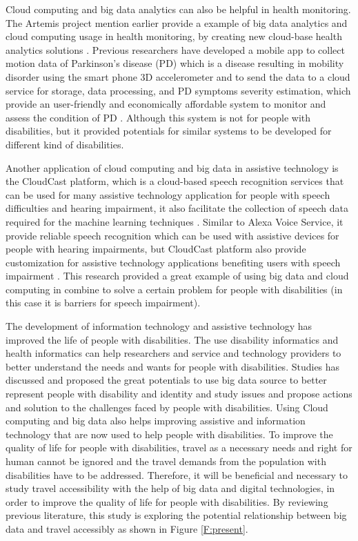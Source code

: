 Cloud computing and big data analytics can also be helpful in health monitoring. The Artemis project mention earlier
provide a example of big data analytics and cloud computing usage in health monitoring, by creating new cloud-base
health analytics solutions \cite{Khazaei14}. Previous researchers have developed a mobile app to collect motion 
data of Parkinson's disease (PD) which is a disease resulting in mobility disorder using the smart phone 3D 
accelerometer and to send the data to a cloud service for storage, data processing, and PD symptoms severity
estimation, which provide an user-friendly and economically affordable system to monitor and assess the condition
of PD \cite{info:doi/10.2196/mhealth.3956}. Although this system is not for people with disabilities, but it 
provided potentials for similar systems to be developed for different kind of disabilities. 

Another application of cloud computing and big data in assistive technology is the CloudCast platform, which is a 
cloud-based speech recognition services that can be used for many assistive technology application for people
with speech difficulties and hearing impairment, it also facilitate the collection of speech data required for
the machine learning techniques \cite{cunningham2017cloud}. Similar to Alexa Voice Service, it provide reliable 
speech recognition which can be used with assistive devices for people with hearing impairments, but CloudCast
platform also provide customization for assistive technology applications benefiting users with speech 
impairment \cite{cunningham2017cloud}. This research provided a great example of using big data and cloud 
computing in combine to solve a certain problem for people with disabilities (in this case it is barriers for speech impairment). 

The development of information technology and assistive technology has improved the life of people with disabilities.
The use disability informatics and health informatics can help researchers and service and technology providers 
to better understand the needs and wants for people with disabilities. Studies has discussed and proposed the 
great potentials to use big data source to better represent people with disability and identity and study 
issues and propose actions and solution to the challenges faced by people with disabilities. Using Cloud 
computing and big data also helps improving assistive and information technology that are now used to 
help people with disabilities. To improve the quality of life for people with disabilities, travel as a 
necessary needs and right for human cannot be ignored and the travel demands from the population with 
disabilities have to be addressed. Therefore, it will be beneficial and necessary to study travel 
accessibility with the help of big data and digital technologies, in order to improve the quality
of life for people with disabilities. By reviewing previous literature, this study is exploring 
the potential relationship between big data and travel accessibly as shown in Figure \ref{F:present}.


